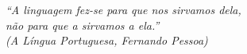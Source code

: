 \begin{epigrafe}
    \vspace*{\fill}
	\begin{flushright}
		\textit{``A linguagem fez-se para que nos sirvamos dela, \\
		não para que a sirvamos a ela.'' \\
		(A Língua Portuguesa, Fernando Pessoa)}
	\end{flushright}
\end{epigrafe}

